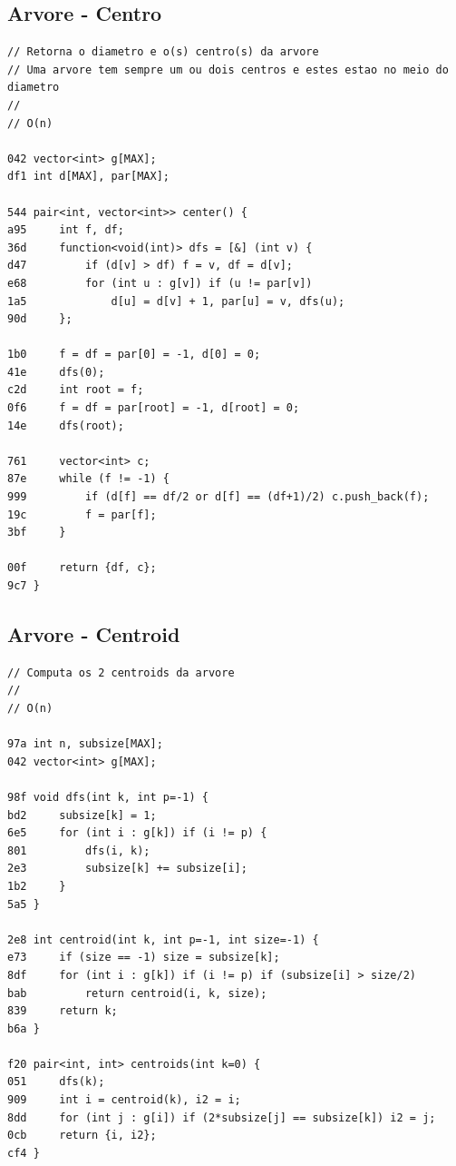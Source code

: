 \documentclass[11pt, a4paper, twoside]{article}
\begin{document}
\subsection{Arvore - Centro}
\begin{lstlisting}
// Retorna o diametro e o(s) centro(s) da arvore
// Uma arvore tem sempre um ou dois centros e estes estao no meio do diametro
//
// O(n)

042 vector<int> g[MAX];
df1 int d[MAX], par[MAX];

544 pair<int, vector<int>> center() {
a95 	int f, df;
36d 	function<void(int)> dfs = [&] (int v) {
d47 		if (d[v] > df) f = v, df = d[v];
e68 		for (int u : g[v]) if (u != par[v]) 
1a5 			d[u] = d[v] + 1, par[u] = v, dfs(u);
90d 	};
     
1b0 	f = df = par[0] = -1, d[0] = 0;
41e 	dfs(0);
c2d 	int root = f;
0f6 	f = df = par[root] = -1, d[root] = 0;
14e 	dfs(root);
     
761  	vector<int> c;
87e 	while (f != -1) {
999 		if (d[f] == df/2 or d[f] == (df+1)/2) c.push_back(f);
19c 		f = par[f];
3bf 	}
     
00f 	return {df, c};
9c7 }
\end{lstlisting}

\subsection{Arvore - Centroid}
\begin{lstlisting}
// Computa os 2 centroids da arvore
//
// O(n)

97a int n, subsize[MAX];
042 vector<int> g[MAX];

98f void dfs(int k, int p=-1) {
bd2 	subsize[k] = 1;
6e5 	for (int i : g[k]) if (i != p) {
801 		dfs(i, k);
2e3 		subsize[k] += subsize[i];
1b2 	}
5a5 }

2e8 int centroid(int k, int p=-1, int size=-1) {
e73 	if (size == -1) size = subsize[k];
8df 	for (int i : g[k]) if (i != p) if (subsize[i] > size/2)
bab 		return centroid(i, k, size);
839 	return k;
b6a }

f20 pair<int, int> centroids(int k=0) {
051 	dfs(k);
909 	int i = centroid(k), i2 = i;
8dd 	for (int j : g[i]) if (2*subsize[j] == subsize[k]) i2 = j;
0cb 	return {i, i2};
cf4 }
\end{lstlisting}
\end{document}
